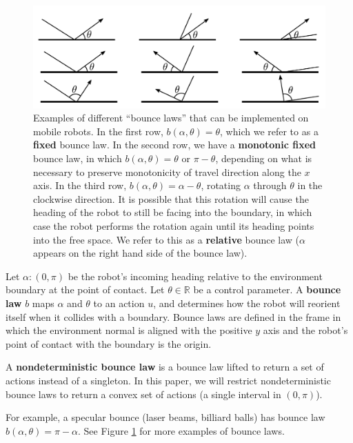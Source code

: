 \documentclass[]{styles/svproc}  %
\begin{document}
\begin{figure}
    \includegraphics[width=0.8\linewidth]{figures/bounce_examples.pdf}
    \centering
    \caption[test]{\label{fig:bex}Examples of different ``bounce laws'' that can be implemented on
mobile robots. In the first row, $b(\alpha, \theta) = \theta$, which we refer to
as a \textbf{fixed} bounce law. In the second row, we have a \textbf{monotonic
fixed} bounce law, in which
$b(\alpha, \theta) = \theta$ or $\pi-\theta$, depending on what is necessary to
preserve monotonicity of travel direction along the $x$ axis. In the third
row, $b(\alpha, \theta) = \alpha - \theta$, rotating $\alpha$ through $\theta$ in the clockwise
direction. It is possible that this rotation will cause the 
heading of the robot to still be facing into the boundary, in which case the robot 
performs the rotation again until its heading points into the free space. We
refer to this as a \textbf{relative} bounce law ($\alpha$ appears on the
right hand side of the bounce law).
}
\end{figure}

\begin{definition}
Let $\alpha: (0,\pi)$ be the robot's incoming heading relative to the
environment boundary at the point of contact. Let $\theta \in \mathbb{R}$ be a control parameter. A 
\textbf{bounce law} $b$ maps $\alpha$ and $\theta$ to an action
$u$, and determines how the robot will reorient itself when it collides with a
boundary. Bounce laws are defined in the
frame in which the environment normal is aligned with the positive $y$ axis and the
robot's point of contact with the boundary is the origin.
\end{definition}
\begin{definition}
A \textbf{nondeterministic bounce law} is a bounce law lifted to return a set of actions
instead of a singleton. In this paper, we will restrict nondeterministic bounce laws to
return a convex set of actions (a single interval in $(0, \pi)$).
\end{definition}

For example, a specular bounce (laser beams, billiard balls) has bounce law
$b(\alpha, \theta) = \pi - \alpha$. See Figure \ref{fig:bex} for more
examples of bounce laws. 
\end{document}
